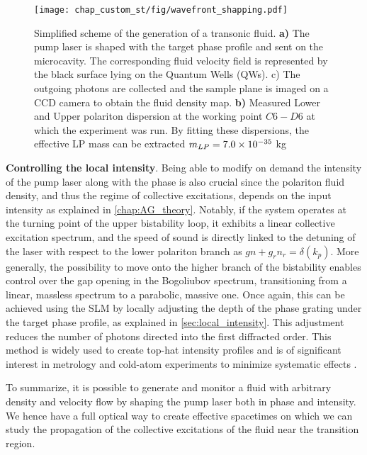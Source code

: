 \begin{figure}
    \centering
    \texttt{[image: chap\_custom\_st/fig/wavefront\_shapping.pdf]}
    \caption{Simplified scheme of the generation of a transonic fluid. \textbf{a)} The pump laser is shaped with the target phase profile and sent on the microcavity. The corresponding fluid velocity field is represented by the black surface lying on the Quantum Wells (QWs). c) The outgoing photons are collected and the sample 
    plane is imaged on a CCD camera to obtain the fluid density map.  \textbf{b)} Measured Lower and Upper polariton dispersion at the working point $C6-D6$ at which the experiment was run. By fitting these dispersions,
    the effective LP mass can be extracted $m_{LP}= 7.0 \times 10^{-35}$ kg}
    \label{fig:wavefront_shapping}
\end{figure}


\bigskip 

\textbf{Controlling the local intensity}. Being able to modify on demand the intensity of the pump laser along with the phase is also crucial since the polariton fluid density, and thus the regime of collective excitations, depends on the input intensity as explained in \autoref{chap:AG_theory}. 
Notably, if the system operates at the turning point of the upper bistability loop, it exhibits a linear collective excitation spectrum, and the speed of sound is directly linked to the detuning of the laser with respect to the lower polariton branch as $gn+g_rn_r=\delta(k_p)$. 
More generally, the possibility to move onto the higher branch of the bistability enables control over the gap opening in the Bogoliubov spectrum, transitioning from a linear, massless spectrum to a parabolic, massive one.  
Once again, this can be achieved using the SLM by locally adjusting the depth of the phase grating under the target phase profile, as explained in \autoref{sec:local_intensity}. This adjustment reduces the number of photons directed into the first diffracted order. This method is widely used to create top-hat intensity profiles and is of significant interest in metrology and cold-atom experiments to minimize systematic effects \cite{top_metrology_2018}.  

\bigskip




To summarize, it is possible to generate and monitor a fluid with arbitrary density and velocity flow by shaping the pump laser both in phase and intensity. We hence have a full optical way to create
effective spacetimes on which we can study the propagation of the collective excitations of the fluid near the transition region.


